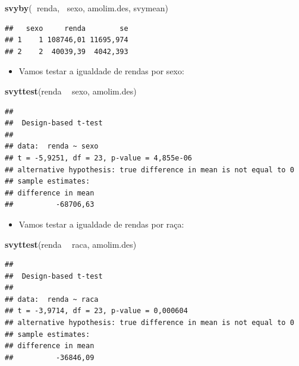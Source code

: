 \documentclass[]{book}
\newenvironment{Shaded}{\begin{snugshade}}{\end{snugshade}}
\newcommand{\KeywordTok}[1]{\textcolor[rgb]{0.13,0.29,0.53}{\textbf{#1}}}
\newcommand{\StringTok}[1]{\textcolor[rgb]{0.31,0.60,0.02}{#1}}
\newcommand{\OperatorTok}[1]{\textcolor[rgb]{0.81,0.36,0.00}{\textbf{#1}}}
\newcommand{\NormalTok}[1]{#1}
\providecommand{\tightlist}{%
  \setlength{\itemsep}{0pt}\setlength{\parskip}{0pt}}
\theoremstyle{definition}
\theoremstyle{definition}
\theoremstyle{definition}
\theoremstyle{remark}
\begin{document}
\begin{Shaded}
\begin{Highlighting}[]
\KeywordTok{svyby}\NormalTok{(}\OperatorTok{~}\NormalTok{renda, }\OperatorTok{~}\NormalTok{sexo, amolim.des, svymean)}
\end{Highlighting}
\end{Shaded}

\begin{verbatim}
##   sexo     renda        se
## 1    1 108746,01 11695,974
## 2    2  40039,39  4042,393
\end{verbatim}

\begin{itemize}
\tightlist
\item
  Vamos testar a igualdade de rendas por sexo:
\end{itemize}

\begin{Shaded}
\begin{Highlighting}[]
\KeywordTok{svyttest}\NormalTok{(renda }\OperatorTok{~}\StringTok{ }\NormalTok{sexo, amolim.des)}
\end{Highlighting}
\end{Shaded}

\begin{verbatim}
## 
##  Design-based t-test
## 
## data:  renda ~ sexo
## t = -5,9251, df = 23, p-value = 4,855e-06
## alternative hypothesis: true difference in mean is not equal to 0
## sample estimates:
## difference in mean 
##          -68706,63
\end{verbatim}

\begin{itemize}
\tightlist
\item
  Vamos testar a igualdade de rendas por raça:
\end{itemize}

\begin{Shaded}
\begin{Highlighting}[]
\KeywordTok{svyttest}\NormalTok{(renda }\OperatorTok{~}\StringTok{ }\NormalTok{raca, amolim.des)}
\end{Highlighting}
\end{Shaded}

\begin{verbatim}
## 
##  Design-based t-test
## 
## data:  renda ~ raca
## t = -3,9714, df = 23, p-value = 0,000604
## alternative hypothesis: true difference in mean is not equal to 0
## sample estimates:
## difference in mean 
##          -36846,09
\end{verbatim}
\end{document}
